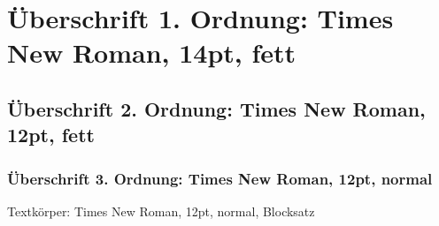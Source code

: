 \documentclass[12pt,a4paper]{article}
\begin{document}
\section{Überschrift 1. Ordnung: Times New Roman, 14pt, fett}

\subsection{Überschrift 2. Ordnung: Times New Roman, 12pt, fett}

\subsubsection{Überschrift 3. Ordnung: Times New Roman, 12pt, normal}
Textkörper: Times New Roman, 12pt, normal, Blocksatz


%
% 
%
\nocite{Fellbaum1999}
\nocite{2003_ESSV_MM}

\end{document}
